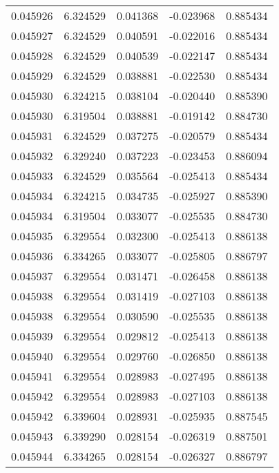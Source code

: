 \begin{tabular}{lrrrr}
0.045926    &  6.324529 &  0.041368 & -0.023968 &             0.885434 \\
0.045927    &  6.324529 &  0.040591 & -0.022016 &             0.885434 \\
0.045928    &  6.324529 &  0.040539 & -0.022147 &             0.885434 \\
0.045929    &  6.324529 &  0.038881 & -0.022530 &             0.885434 \\
0.045930    &  6.324215 &  0.038104 & -0.020440 &             0.885390 \\
0.045930    &  6.319504 &  0.038881 & -0.019142 &             0.884730 \\
0.045931    &  6.324529 &  0.037275 & -0.020579 &             0.885434 \\
0.045932    &  6.329240 &  0.037223 & -0.023453 &             0.886094 \\
0.045933    &  6.324529 &  0.035564 & -0.025413 &             0.885434 \\
0.045934    &  6.324215 &  0.034735 & -0.025927 &             0.885390 \\
0.045934    &  6.319504 &  0.033077 & -0.025535 &             0.884730 \\
0.045935    &  6.329554 &  0.032300 & -0.025413 &             0.886138 \\
0.045936    &  6.334265 &  0.033077 & -0.025805 &             0.886797 \\
0.045937    &  6.329554 &  0.031471 & -0.026458 &             0.886138 \\
0.045938    &  6.329554 &  0.031419 & -0.027103 &             0.886138 \\
0.045938    &  6.329554 &  0.030590 & -0.025535 &             0.886138 \\
0.045939    &  6.329554 &  0.029812 & -0.025413 &             0.886138 \\
0.045940    &  6.329554 &  0.029760 & -0.026850 &             0.886138 \\
0.045941    &  6.329554 &  0.028983 & -0.027495 &             0.886138 \\
0.045942    &  6.329554 &  0.028983 & -0.027103 &             0.886138 \\
0.045942    &  6.339604 &  0.028931 & -0.025935 &             0.887545 \\
0.045943    &  6.339290 &  0.028154 & -0.026319 &             0.887501 \\
0.045944    &  6.334265 &  0.028154 & -0.026327 &             0.886797 \\

\end{tabular}
